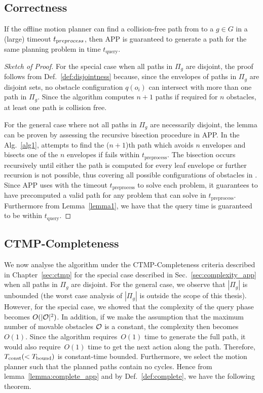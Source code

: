 \documentclass[a4paper]{report}
\begin{document}
\subsection{Correctness}
\begin{lemma}
\label{lemma:complete_app}
If the offline motion planner \calP can find a collision-free path from \Sstart to a $g \in G$ in a (large) timeout $t_{\textrm preprocess}$, then APP is guaranteed to generate a path for the same planning problem in time $t_{\textrm {query}}$.
\end{lemma}
\begin{proof}[Sketch of Proof]
For the special case when all paths in $\Pi_g$ are disjoint, the proof follows from Def.~\ref{def:disjointness} because, since the envelopes of paths in $\Pi_g$ are disjoint sets, no obstacle configuration $q(o_i)$ can intersect with more than one path in $\Pi_g$. Since the algorithm computes $n+1$ paths if required for $n$ obstacles, at least one path is collision free.

For the general case where not all paths in $\Pi_g$ are necessarily disjoint, the lemma can be proven by assessing the recursive bisection procedure in APP. In the Alg.~\ref{alg1}, \calP attempts to find the ($n+1$)th path which avoids $n$ envelopes and bisects one of the $n$ envelopes if \calP fails within $t_{\textrm {preprocess}}$. The bisection occurs recursively until either the path is computed for every leaf envelope or further recursion is not possible, thus covering all possible configurations of obstacles in \calO. Since APP uses \calP with the timeout $t_{\textrm {preprocess}}$ to solve each problem, it guarantees to have precomputed a valid path for any problem that \calP can solve in $t_{\textrm {preprocess}}$.
Furthermore from Lemma~\ref{lemma1}, we have that the query time is guaranteed to be within $t_{\textrm {query}}$.
\end{proof}

\subsection{CTMP-Completeness}
We now analyse the algorithm under the CTMP-Completeness criteria described in Chapter~\ref{sec:ctmp} for the special case described in Sec.~\ref{sec:complexity_app} when all paths in $\Pi_g$ are disjoint. For the general case, we observe that $|\Pi_g|$ is unbounded (the worst case analysis of $|\Pi_g|$ is outside the scope of this thesis). However, for the special case, we showed that the complexity of the query phase becomes $O(|\mathcal{O}|^2)$. In addition, if we make the assumption that the maximum number of movable obstacles $\mathcal{O}$ is a constant, the complexity then becomes $O(1)$.
%
Since the algorithm requires~$O(1)$ time to generate the full path, it would also require~$O(1)$ time to get the next action along the path. Therefore, $T_\textrm{const} (< T_{\textrm{bound}})$ is constant-time bounded. Furthermore, we select the motion planner \calP such that the planned paths contain no cycles. Hence from lemma~\ref{lemma:complete_app} and by Def.~\ref{def:complete}, we have the following theorem.
\end{document}

